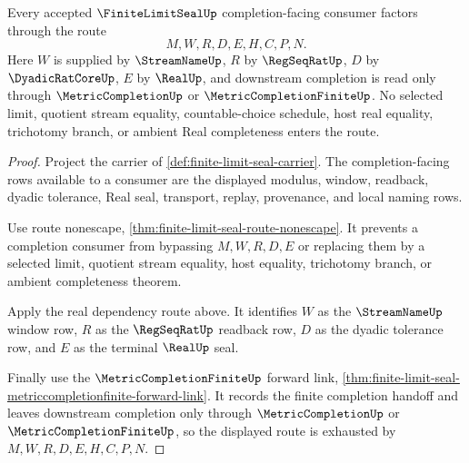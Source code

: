 \begin{theorem}
\label{thm:finite-limit-seal-real-completion-route}
Every accepted $\FiniteLimitSealUp$ completion-facing consumer factors through the route
$$
M,W,R,D,E,H,C,P,N.
$$
Here $W$ is supplied by $\StreamNameUp$, $R$ by $\RegSeqRatUp$, $D$ by $\DyadicRatCoreUp$, $E$ by $\RealUp$, and downstream completion is read only through $\MetricCompletionUp$ or $\MetricCompletionFiniteUp$. No selected limit, quotient stream equality, countable-choice schedule, host real equality, trichotomy branch, or ambient Real completeness enters the route.
\end{theorem}
\begin{proof}
Project the carrier of \autoref{def:finite-limit-seal-carrier}. The completion-facing rows available to a consumer are the displayed modulus, window, readback, dyadic tolerance, Real seal, transport, replay, provenance, and local naming rows.

Use route nonescape, \autoref{thm:finite-limit-seal-route-nonescape}. It prevents a completion consumer from bypassing $M,W,R,D,E$ or replacing them by a selected limit, quotient stream equality, host equality, trichotomy branch, or ambient completeness theorem.

Apply the real dependency route above. It identifies $W$ as the $\StreamNameUp$ window row, $R$ as the $\RegSeqRatUp$ readback row, $D$ as the dyadic tolerance row, and $E$ as the terminal $\RealUp$ seal.

Finally use the $\MetricCompletionFiniteUp$ forward link, \autoref{thm:finite-limit-seal-metriccompletionfinite-forward-link}. It records the finite completion handoff and leaves downstream completion only through $\MetricCompletionUp$ or $\MetricCompletionFiniteUp$, so the displayed route is exhausted by $M,W,R,D,E,H,C,P,N$.
\end{proof}


